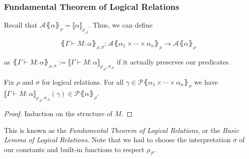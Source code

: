 \documentclass[aspectratio=169]{beamer}
\begin{document}
\begin{frame}
\frametitle{Fundamental Theorem of Logical Relations}

Recall that $\mathcal{A}\lBrace \alpha \rBrace_{\rho} = \llbracket\alpha \rrbracket_{\rho_{\mathcal{A}}}$.
Thus, we can define

\[
\lBrace \Gamma \vdash M : \alpha \rBrace_{\rho, \sigma} : \mathcal{A}\lBrace \alpha_1 \times \cdots \times \alpha_n \rBrace_\rho \to \mathcal{A}\lBrace \alpha \rBrace_\rho
\]

as $\lBrace \Gamma \vdash M : \alpha \rBrace_{\rho, \sigma} := \llbracket \Gamma \vdash M : \alpha \rrbracket_{\rho_{\mathcal{A}}, \sigma_{\mathcal{A}}}$ if it actually preserves our predicates.

\medskip

\begin{theorem}
    Fix $\rho$ and $\sigma$ for logical relations.
    For all $\gamma \in \mathcal{P}\lBrace \alpha_1 \times \cdots \times \alpha_n \rBrace_\rho$ we have $\llbracket \Gamma \vdash M : \alpha \rrbracket_{\rho_{\mathcal{A}}, \sigma_{\mathcal{A}}}(\gamma) \in \mathcal{P}\lBrace \alpha \rBrace_\rho$.
    \begin{proof}
        Induction on the structure of $M$.
    \end{proof}
\end{theorem}

\medskip

This is known as the \emph{Fundamental Theorem of Logical Relations}, or the \emph{Basic Lemma of Logical Relations}.
Note that we had to choose the interpretation $\sigma$ of our constants and built-in functions to respect $\rho_{\mathcal{P}}$.
\end{frame}
\end{document}
